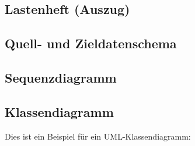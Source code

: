 \documentclass[11pt,toc=sectionentrywithoutdots, 
headheight=44pt, headings=optiontoheadandtoc, hyperfootnotes=false, hypertexnames=false]{scrartcl}
\begin{document}
\subsection{Lastenheft (Auszug)}
\blindtext\blindtext

\subsection{Quell- und Zieldatenschema}
\blindtext\blindtext

\subsection{Sequenzdiagramm}
\blindtext


\subsection{Klassendiagramm}

Dies ist ein Beispiel für ein UML-Klassendiagramm:\\
\end{document}
